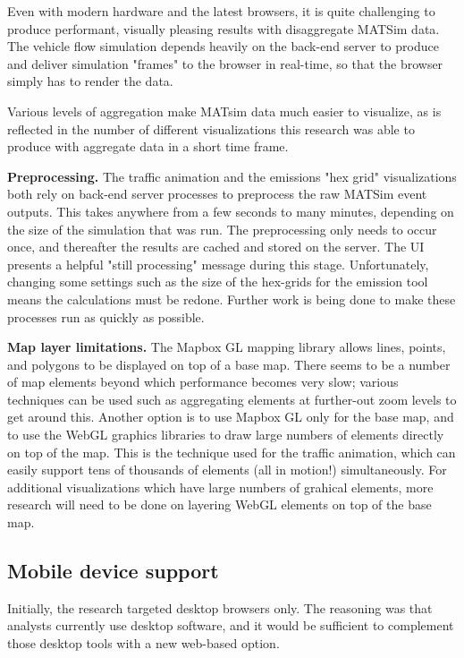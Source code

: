 \documentclass[Afour,sagev,times]{sagej}
\begin{document}
Even with modern hardware and the latest browsers, it is quite challenging to produce performant, visually pleasing results with disaggregate MATSim data. The vehicle flow simulation depends heavily on the back-end server to produce and deliver simulation "frames" to the browser in real-time, so that the browser simply has to render the data.

Various levels of aggregation make MATsim data much easier to visualize, as is reflected in the number of different visualizations this research was able to produce with aggregate data in a short time frame.

\textbf{Preprocessing.} The traffic animation and the emissions "hex grid" visualizations both rely on back-end server processes to preprocess the raw MATSim event outputs. This takes anywhere from a few seconds to many minutes, depending on the size of the simulation that was run. The preprocessing only needs to occur once, and thereafter the results are cached and stored on the server. The UI presents a helpful "still processing" message during this stage. Unfortunately, changing some settings such as the size of the hex-grids for the emission tool means the calculations must be redone. Further work is being done to make these processes run as quickly as possible.

\textbf{Map layer limitations.} The Mapbox GL mapping library allows lines, points, and polygons to be displayed on top of a base map. There seems to be a number of map elements beyond which performance becomes very slow; various techniques can be used such as aggregating elements at further-out zoom levels to get around this. Another option is to use Mapbox GL only for the base map, and to use the WebGL graphics libraries to draw large numbers of elements directly on top of the map. This is the technique used for the traffic animation, which can easily support tens of thousands of elements (all in motion!) simultaneously. For additional visualizations which have large numbers of grahical elements, more research will need to be done on layering WebGL elements on top of the base map.

\subsection{Mobile device support}

Initially, the research targeted desktop browsers only. The reasoning was that analysts currently use desktop software, and it would be sufficient to complement those desktop tools with a new web-based option.
\end{document}
